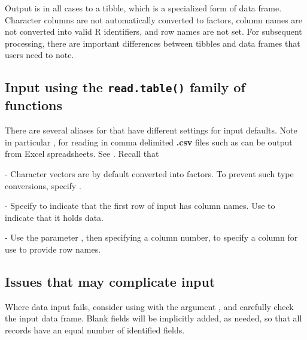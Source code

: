 Output is in all cases to a tibble, which is a specialized form
of data frame. 
Character columns are not automatically converted to factors,
column names are not converted into valid R identifiers, and row
names are not set.  For subsequent processing, there are
important differences between tibbles and data frames that users
need to note.

\subsection{Input using the \texttt{read.table()} family of functions}

There are several aliases for  that have different
settings for input defaults. Note in particular ,
for reading in comma delimited {\bf .csv} files such as can be output
from Excel spreadsheets.  See . Recall that


\begin{itemizz}
\item[-] Character vectors are by default converted into factors.  To
  prevent such type conversions, specify
  .

\item[-] Specify  to indicate that the first row
  of input has column names. Use 
  to indicate that it holds data.\newline {}

\item[-] Use the parameter , then specifying a column
number, to specify a column for use to provide row names.
\end{itemizz}

\subsection*{Issues that may complicate input}

Where data input fails, consider using  with the
argument , and carefully check the input data frame.
Blank fields will be implicitly added, as needed, so that all records
have an equal number of identified fields.

